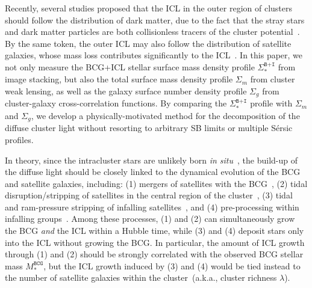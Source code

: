 \documentclass[fleqn,usenatbib]{mnras}
\newcommand{\sigbi}{\Sigma_*^{\texttt{B+I}}}
\newcommand{\sigm}{\Sigma_m}
\newcommand{\sigg}{\Sigma_g}
\newcommand{\msbcg}{M_*^{\texttt{BCG}}}
\begin{document}
Recently, several studies proposed that the ICL in the outer region of
clusters should follow the distribution of dark matter, due to the fact
that the stray stars and dark matter particles are both collisionless
tracers of the cluster potential~\citep{Montes2019, AlonsoAsensio2020,
Contini2020, SampaioSantos2021}. By the same token, the outer ICL may also follow the
distribution of satellite galaxies, whose mass loss contributes
significantly to the ICL~\citep{Purcell2007, Martel2012, Contini2014,
Morishita2017}. In this paper, we not only measure the BCG+ICL stellar
surface mass density profile $\sigbi$ from image stacking, but also the
total surface mass density profile $\sigm$ from cluster weak lensing, as
well as the galaxy surface number density profile $\sigg$ from
cluster-galaxy cross-correlation functions. By comparing the $\sigbi$
profile with $\sigm$ and $\sigg$, we develop a physically-motivated method
for the decomposition of the diffuse cluster light without resorting to
arbitrary SB limits or multiple S\'ersic profiles.


In theory, since the intracluster stars are unlikely born {\it in
situ}~\citep{Puchwein2010, Melnick2012}, the build-up of the diffuse light
should be closely linked to the dynamical evolution of the BCG and
satellite galaxies, including: (1) mergers of satellites with the
BCG~\citep{Murante2007, Burke2015}, (2) tidal disruption/stripping of
satellites in the central region of the cluster~\citep{Purcell2007,
Wetzel2010, Montes2014, DeMaio2015, Contini2018}, (3) tidal and
ram-pressure stripping of infalling satellites~\citep{Rudick2009,
Contini2014, Montes2018, DeMaio2018, Contini2019, JimenezTeja2018}, and (4)
pre-processing within infalling groups~\citep{Willman2004,
SommerLarsen2006, Rudick2006}.  Among these processes, (1) and (2) can
simultaneously grow the BCG {\it and} the ICL within a Hubble time, while
(3) and (4) deposit stars only into the ICL without growing the BCG.  In
particular, the amount of ICL growth through (1) and (2) should be strongly
correlated with the observed BCG stellar mass $\msbcg$, but the ICL growth
induced by (3) and (4) would be tied instead to the number of satellite
galaxies within the cluster~(a.k.a., cluster richness $\lambda$).
\end{document}
